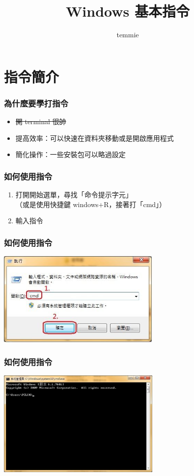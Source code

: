 \documentclass[mathserif]{beamer}
\title{Windows 基本指令}
\author{temmie}
\date{}
\begin{document}
\begin{frame}
    \titlepage
\end{frame}

\begin{frame}
    \tableofcontents
\end{frame}

\section{指令簡介}

\begin{frame}
    \frametitle{為什麼要學打指令}
    \begin{itemize}
        \item \sout{開 terminal 很帥}
        \item<2-> 提高效率：可以快速在資料夾移動或是開啟應用程式
        \item<2-> 簡化操作：一些安裝包可以略過設定
    \end{itemize}
\end{frame}

\begin{frame}
    \frametitle{如何使用指令}
    \begin{enumerate}
        \item 打開開始選單，尋找「命令提示字元」\\
        （或是使用快捷鍵 windows+R，接著打「cmd」）
        \item<2-> 輸入指令
    \end{enumerate}
\end{frame}

\begin{frame}
    \frametitle{如何使用指令}
    \includegraphics[width=8.0cm]{img/cmd_1.jpg}
\end{frame}

\begin{frame}
    \frametitle{如何使用指令}
    \includegraphics[width=8.0cm]{img/cmd_2.jpg}
\end{frame}
\end{document}
